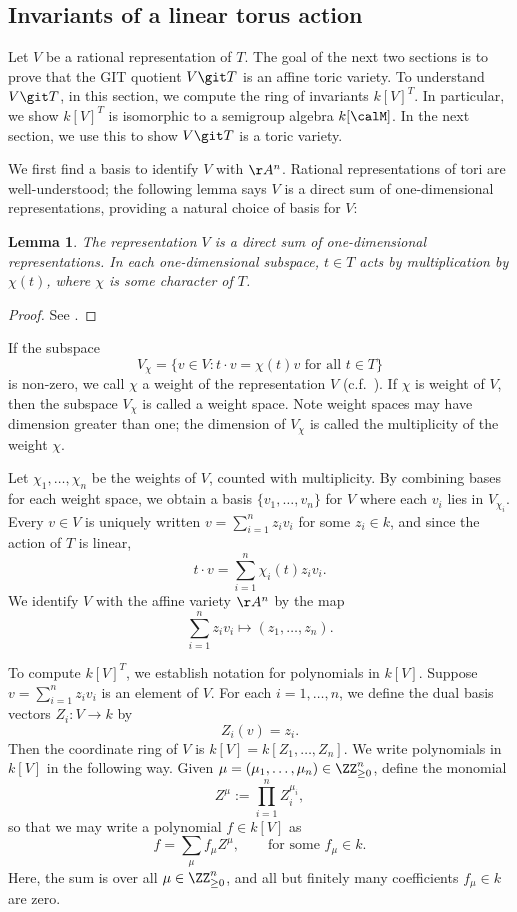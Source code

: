 \documentclass[12pt]{amsart}
\theoremstyle{plain}
\newtheorem{lemma}[theorem]{Lemma}
\theoremstyle{definition}
\begin{document}
\subsection{Invariants of a linear torus action}\label{section:invariantsoftorus}
Let $V$ be a rational representation of $T$.
The goal of the next two sections is to prove that the GIT quotient $V \git T$ is an affine toric variety.
To understand $V \git T$, in this section, we compute the ring of invariants $k[V]^T$.
In particular, we show $k[V]^T$ is isomorphic to a semigroup algebra $k[\calM]$.
In the next section, we use this to show $V \git T$ is a toric variety.

We first find a basis to identify $V$ with $\AA^n$.
Rational representations of tori are well-understood; the following lemma says $V$ is a direct sum of one-dimensional representations, providing a natural choice of basis for $V$:

\begin{lemma}
The representation $V$ is a direct sum of one-dimensional representations.
In each one-dimensional subspace, $t \in T$ acts by multiplication by $\chi(t)$, where $\chi$ is some character of $T$.
\end{lemma}
\begin{proof}
See \cite[3.2.3]{Springer98}.
\end{proof}

If the subspace
$$V_\chi = \{v \in V : t \cdot v = \chi(t) v \text{ for all } t \in T\}$$
is non-zero, we call $\chi$ a weight of the representation $V$ (c.f.\ \cite[7.1.1]{Springer98}).
If $\chi$ is weight of $V$, then the subspace $V_\chi$ is called a weight space.
Note weight spaces may have dimension greater than one; the dimension of $V_\chi$ is called the multiplicity of the weight $\chi$.

Let $\chi_1, \ldots, \chi_n$ be the weights of $V$, counted with multiplicity. 
By combining bases for each weight space, we obtain a basis $\{v_1, \ldots, v_n\}$ for $V$ where each $v_i$ lies in $V_{\chi_i}$.
Every $v \in V$ is uniquely written $v = \sum_{i=1}^n z_i v_i$ for some $z_i \in k$, and since the action of $T$ is linear, 
$$t \cdot v = \sum_{i=1}^n \chi_i(t) z_i v_i.$$
We identify $V$ with the affine variety $\AA^n$ by the map
$$\sum_{i=1}^n z_i v_i \mapsto (z_1, \ldots, z_n).$$

To compute $k[V]^T$, we establish notation for polynomials in $k[V]$.
Suppose $v = \sum_{i=1}^n z_i v_i$ is an element of $V$.
For each $i=1, \ldots, n$, we define the dual basis vectors $Z_i : V \to k$ by
$$Z_i(v) = z_i.$$
Then the coordinate ring of $V$ is $k[V] = k[Z_1, \ldots, Z_n]$.
We write polynomials in $k[V]$ in the following way.
Given $\mu = (\mu_1, \ldots, \mu_n) \in \ZZ_{\ge 0}^n$, define the monomial
$$Z^\mu := \prod_{i=1}^n Z_i^{\mu_i},$$
so that we may write a polynomial $f \in k[V]$ as
$$f = \sum_\mu f_\mu Z^\mu, \qquad \text{for some } f_\mu \in k.$$
Here, the sum is over all $\mu \in \ZZ_{\ge 0}^n$, and all but finitely many coefficients $f_\mu \in k$ are zero.
\end{document}
